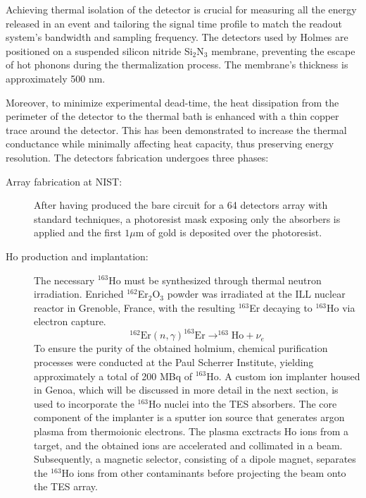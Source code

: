 Achieving thermal isolation of the detector is crucial for measuring all the energy released in an event and tailoring the signal time profile to match the readout
system's bandwidth and sampling frequency. The detectors used by Holmes are positioned on a suspended silicon nitride Si$_2$N$_3$
membrane, preventing the escape of hot phonons during the thermalization process. The
membrane's thickness is approximately 500 nm. 

Moreover, to minimize experimental dead-time, the heat dissipation from the perimeter of the detector to the thermal bath is enhanced with a thin copper trace around the detector. This has been demonstrated to
increase the thermal conductance while minimally affecting heat capacity, thus preserving energy resolution.
The detectors fabrication undergoes three phases: 
\begin{description}
  \item[Array fabrication at NIST:] After having produced the bare circuit for a 64 detectors array with standard techniques, a photoresist
    mask exposing only the absorbers is applied and the first $1\mu$m of gold is deposited over the photoresist.
  \item[Ho production and implantation:]
The necessary $^{163}$Ho must be synthesized through thermal neutron irradiation. Enriched $^{162}$Er$_2$O$_3$ powder
was irradiated at the ILL nuclear reactor in Grenoble, France, with the resulting $^{163}$Er decaying to $^{163}$Ho via electron capture. 
\begin{equation}
^{162}\text{Er}(n, \gamma)^{163}\text{Er} \rightarrow ^{163}\text{Ho} + \nu_e
\end{equation}
To ensure the purity of the obtained holmium, chemical purification processes were conducted at the Paul Scherrer
Institute, yielding approximately a total of 200 MBq of $^{163}$Ho.
A custom ion implanter housed in Genoa, which will be discussed in more detail in the next section, is used to
incorporate the $^{163}$Ho nuclei into the TES absorbers. The core component
of the implanter is a sputter ion source that generates argon plasma from thermoionic electrons. The plasma exctracts Ho ions from a
target, and the obtained ions are accelerated and collimated in a beam. Subsequently, a magnetic selector,
consisting of a dipole magnet, separates the $^{163}$Ho ions from other contaminants before projecting the beam onto the TES
array.  


\end{description}
